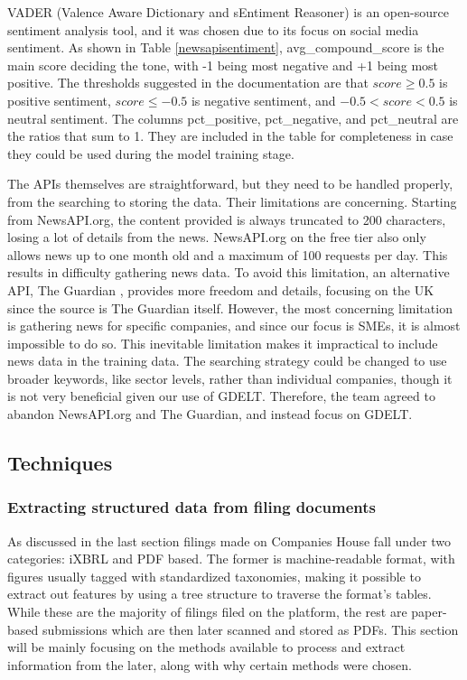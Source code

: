 \documentclass[ %
                    author={Natchalin Iwsakul \\[0.4em] Inkaphol Siriwongwattana \\[0.4em] Tanaphan Kummaraphat \\[0.6em] Patorn Srisupap},,
                supervisor={Fernando Moreno-Pino},
                    degree={MSc},
                     title={Propensity Modelling for SME Commercial Lending Using Open Public Data
},
                  subtitle={Companies House and GDELT as predictors of first-time borrowing},
                      type={},
                      year={2026}]{dissertation}
\begin{document}
VADER (Valence Aware Dictionary and sEntiment Reasoner) \cite{hutto_cjhuttovadersentiment_2026} is an open-source sentiment analysis tool, and it was chosen due to its focus on social media sentiment. As shown in Table \ref{newsapisentiment}, avg\_compound\_score is the main score deciding the tone, with -1 being most negative and +1 being most positive. The thresholds suggested in the documentation \cite{} are that $score \geq 0.5$ is positive sentiment, $score \leq -0.5$ is negative sentiment, and $-0.5 < score < 0.5$ is neutral sentiment. The columns pct\_positive, pct\_negative, and pct\_neutral are the ratios that sum to 1. They are included in the table for completeness in case they could be used during the model training stage.

The APIs themselves are straightforward, but they need to be handled properly, from the searching to storing the data. Their limitations are concerning. Starting from NewsAPI.org, the content provided is always truncated to 200 characters, losing a lot of details from the news. NewsAPI.org \cite{newsapi.org} on the free tier also only allows news up to one month old and a maximum of 100 requests per day. This results in difficulty gathering news data. To avoid this limitation, an alternative API, The Guardian \cite{theguardian}, provides more freedom and details, focusing on the UK since the source is The Guardian itself. However, the most concerning limitation is gathering news for specific companies, and since our focus is SMEs, it is almost impossible to do so. This inevitable limitation makes it impractical to include news data in the training data. The searching strategy could be changed to use broader keywords, like sector levels, rather than individual companies, though it is not very beneficial given our use of GDELT. Therefore, the team agreed to abandon NewsAPI.org and The Guardian, and instead focus on GDELT.


\subsection{Techniques}
\label{sec:techniques}

\subsubsection{Extracting structured data from filing documents}
\label{sec:extraction}
As discussed in the last section filings made on Companies House fall under two categories: iXBRL and PDF based. The former is machine-readable format, with figures usually tagged with standardized taxonomies, making it possible to extract out features by using a tree structure to traverse the format's tables. While these are the majority of filings filed on the platform, the rest are paper-based submissions which are then later scanned and stored as PDFs. This section will be mainly focusing on the methods available to process and extract information from the later, along with why certain methods were chosen.
\end{document}
